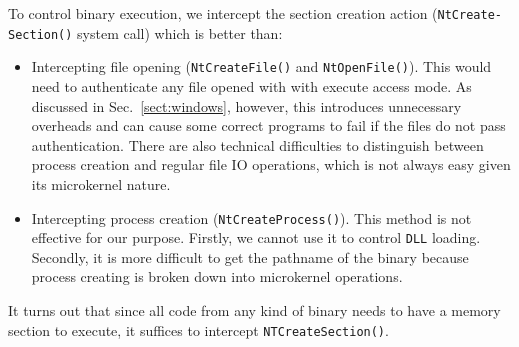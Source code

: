 To control binary execution, we intercept the section creation action 
({\tt NtCreate-\\Section()} system call) which is better than:
\begin{itemize}
\item Intercepting file opening ({\tt NtCreateFile()} and {\tt NtOpenFile()}).
This would need to authenticate any file opened with with execute access mode.
As discussed in Sec.~\ref{sect:windows}, however, this introduces
unnecessary overheads and can cause some correct programs to fail if the files
do not pass authentication.
There are also technical difficulties to distinguish between
process creation and regular file IO operations, which is not always easy given
its microkernel nature.
\item Intercepting process creation ({\tt NtCreateProcess()}).
This method is not effective for our purpose.
Firstly, we cannot use it to control {\tt DLL} loading.
Secondly, it is more difficult to get the pathname of the binary because
process creating is broken down into microkernel operations.
\end{itemize}
It turns out that since all code from any kind of binary
needs to have a memory section to execute,
it suffices to intercept {\tt NTCreateSection()}.

